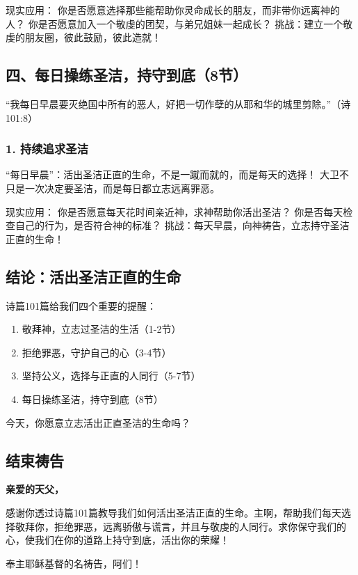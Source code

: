 \documentclass[a4paper, 12pt]{article}
\begin{document}
现实应用：
你是否愿意选择那些能帮助你灵命成长的朋友，而非带你远离神的人？
你是否愿意加入一个敬虔的团契，与弟兄姐妹一起成长？
挑战：建立一个敬虔的朋友圈，彼此鼓励，彼此造就！

\subsection*{四、每日操练圣洁，持守到底（8节）}
“我每日早晨要灭绝国中所有的恶人，好把一切作孽的从耶和华的城里剪除。”（诗101:8）

\subsubsection*{1. 持续追求圣洁}
\hspace{0.4cm}“每日早晨”：活出圣洁正直的生命，不是一蹴而就的，而是每天的选择！
大卫不只是一次决定要圣洁，而是每日都立志远离罪恶。

现实应用：
你是否愿意每天花时间亲近神，求神帮助你活出圣洁？
你是否每天检查自己的行为，是否符合神的标准？
挑战：每天早晨，向神祷告，立志持守圣洁正直的生命！

\subsection*{结论：活出圣洁正直的生命}
诗篇101篇给我们四个重要的提醒：
\begin{enumerate}
    \item 敬拜神，立志过圣洁的生活（1-2节）

    \item 拒绝罪恶，守护自己的心（3-4节）

    \item 坚持公义，选择与正直的人同行（5-7节）

    \item 每日操练圣洁，持守到底（8节）

\end{enumerate}

今天，你愿意立志活出正直圣洁的生命吗？

\subsection*{结束祷告}
\textbf{亲爱的天父，}

感谢你透过诗篇101篇教导我们如何活出圣洁正直的生命。主啊，帮助我们每天选择敬拜你，拒绝罪恶，远离骄傲与谎言，并且与敬虔的人同行。求你保守我们的心，使我们在你的道路上持守到底，活出你的荣耀！

奉主耶稣基督的名祷告，阿们！
\newpage
\end{document}
